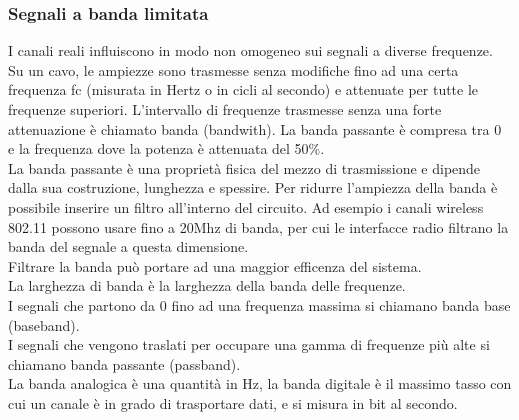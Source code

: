 \documentclass{article}
\begin{document}
		\subsubsection{Segnali a banda limitata}
			I canali reali influiscono in modo non omogeneo sui segnali a diverse frequenze.\\
			Su un cavo, le ampiezze sono trasmesse senza modifiche fino ad una certa frequenza f\ped c (misurata in Hertz o in cicli al secondo) e attenuate per tutte le frequenze superiori.
			L'intervallo di frequenze trasmesse senza una forte attenuazione è chiamato banda (bandwith). La banda passante è compresa tra 0 e la frequenza dove la potenza è attenuata del 50\%. \\
			La banda passante è una proprietà fisica del mezzo di trasmissione e dipende dalla sua costruzione, lunghezza e spessire. Per ridurre l'ampiezza della banda è possibile inserire un filtro all'interno del circuito. Ad esempio i canali wireless 802.11 possono usare fino a 20Mhz di banda, per cui le interfacce radio filtrano la banda del segnale a questa dimensione.\\
			Filtrare la banda può portare ad una maggior efficenza del sistema.\\
			La larghezza di banda è la larghezza della banda delle frequenze. \\
			I segnali che partono da 0 fino ad una frequenza massima si chiamano banda base (baseband).\\
			I segnali che vengono traslati per occupare una gamma di frequenze più alte si chiamano banda passante (passband).\\
			La banda analogica è una quantità in Hz, la banda digitale è il massimo tasso con cui un canale è in grado di trasportare dati, e si misura in bit al secondo. 
\end{document}
